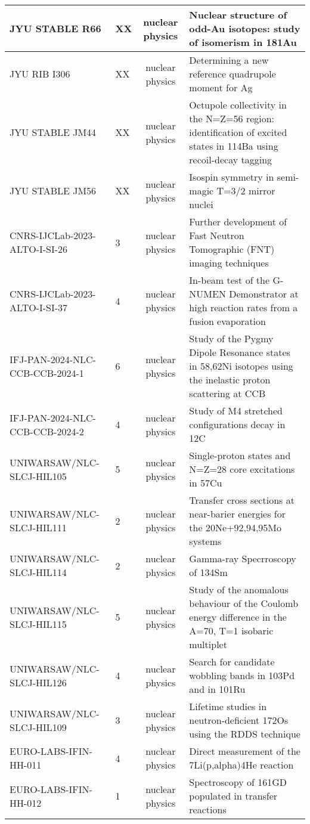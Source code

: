 \begin{xltabular}{\textwidth}{|l|p{0.12\textwidth}|c|Y|}
JYU STABLE R66 & XX & nuclear physics & Nuclear structure of odd-Au isotopes: study of isomerism in 181Au \\ \hline
JYU RIB I306 & XX & nuclear physics & Determining a new reference quadrupole moment for Ag \\ \hline
JYU STABLE JM44 & XX & nuclear physics & Octupole collectivity in the N=Z=56 region: identification of excited states in 114Ba using recoil-decay tagging \\ \hline
JYU STABLE JM56 & XX & nuclear physics & Isospin symmetry in semi-magic T=3/2 mirror nuclei \\ \hline
CNRS-IJCLab-2023-ALTO-I-SI-26  & 	3 &	nuclear physics &	Further development of Fast Neutron Tomographic (FNT) imaging techniques \\ \hline
CNRS-IJCLab-2023-ALTO-I-SI-37	& 4	& nuclear physics&	In-beam test of the G-NUMEN Demonstrator at high reaction rates from a fusion evaporation \\ \hline
IFJ-PAN-2024-NLC-CCB-CCB-2024-1	& 6	& nuclear physics &	Study of the Pygmy Dipole Resonance states in 58,62Ni isotopes using the inelastic proton scattering at CCB \\ \hline
IFJ-PAN-2024-NLC-CCB-CCB-2024-2	& 4 &	nuclear physics	& Study of M4 stretched configurations decay in 12C \\ \hline
UNIWARSAW/NLC-SLCJ-HIL105	& 5	& nuclear physics	& Single-proton states and N=Z=28 core excitations in 57Cu \\ \hline
UNIWARSAW/NLC-SLCJ-HIL111	& 2	& nuclear physics	& Transfer cross sections at near-barier energies for the 20Ne+92,94,95Mo systems \\ \hline
UNIWARSAW/NLC-SLCJ-HIL114	& 2	& nuclear physics &	Gamma-ray Specrroscopy of 134Sm \\ \hline
UNIWARSAW/NLC-SLCJ-HIL115 &	5 &	nuclear physics &	Study of the anomalous behaviour of the Coulomb energy difference in the A=70, T=1 isobaric multiplet \\ \hline
UNIWARSAW/NLC-SLCJ-HIL126	& 4 &	nuclear physics &	Search for candidate wobbling bands in 103Pd and in 101Ru \\ \hline
UNIWARSAW/NLC-SLCJ-HIL109	& 3 &	nuclear physics &	Lifetime studies in neutron-deficient 172Os using the RDDS technique \\ \hline
EURO-LABS-IFIN-HH-011	& 4 &	nuclear physics & 	Direct measurement of the 7Li(p,alpha)4He reaction \\ \hline
EURO-LABS-IFIN-HH-012	& 1 &	nuclear physics &	Spectroscopy of 161GD populated in transfer reactions \\ \hline

\end{xltabular}
